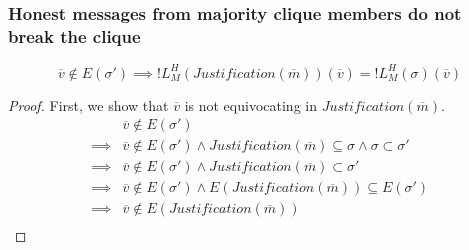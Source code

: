 \subsubsection{Honest messages from majority clique members do not break the clique}


\begin{lemma}
$$
\overline{v} \notin E(\sigma') \implies !L^H_M(Justification(\overline{m}))(\overline{v}) = !L^H_M(\sigma)(\overline{v})
$$
\end{lemma}

\begin{proof}
First, we show that $\overline{v}$ is not equivocating in $Justification(\overline{m})$.
\begin{align}
          &\overline{v} \notin E(\sigma') \\
  \implies&\overline{v} \notin E(\sigma') \land Justification(\overline{m}) \subseteq \sigma \land \sigma \subset \sigma' \\
  \implies&\overline{v} \notin E(\sigma') \land Justification(\overline{m}) \subset \sigma' \\
  \implies&\overline{v} \notin E(\sigma') \land E(Justification(\overline{m})) \subseteq E(\sigma') \\
  \implies&\overline{v} \notin E(Justification(\overline{m})) \\
\end{align}


\end{proof}
